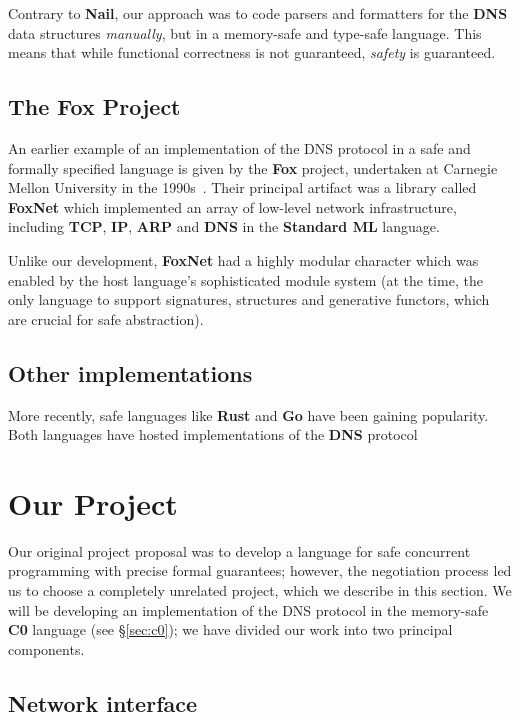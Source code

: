 \documentclass{article}
\newcommand\Kwd[1]{{\sffamily\bfseries{#1}}}
\begin{document}
Contrary to \Kwd{Nail}, our approach was to code parsers and
formatters for the \Kwd{DNS} data structures \emph{manually}, but in a
memory-safe and type-safe language. This means that while functional
correctness is not guaranteed, \emph{safety} is guaranteed.


\subsection*{The \Kwd{Fox} Project}
An earlier example of an implementation of the DNS protocol in a safe
and formally specified language is given by the \Kwd{Fox} project,
undertaken at Carnegie Mellon University in the
1990s~\citep{biagioni-harper-lee-milnes:1994,
  biagioni-harper-lee:2001}. Their principal artifact was a library
called \Kwd{FoxNet} which implemented an array of low-level network
infrastructure, including \Kwd{TCP}, \Kwd{IP}, \Kwd{ARP} and \Kwd{DNS}
in the \Kwd{Standard ML} language.

Unlike our development, \Kwd{FoxNet} had a highly modular character
which was enabled by the host language's sophisticated module system
(at the time, the only language to support signatures, structures and
generative functors, which are crucial for safe abstraction).


\subsection*{Other implementations}

More recently, safe languages
like \Kwd{Rust} and \Kwd{Go} have been gaining popularity. Both
languages have hosted implementations of the \Kwd{DNS}
protocol~\citep{github:trust-dns,github:miekg-dns}


\section{Our Project}\label{sec:our-project}

Our original project proposal was to develop a language for safe
concurrent programming with precise formal guarantees; however, the
negotiation process led us to choose a completely unrelated project,
which we describe in this section. We will be developing an
implementation of the DNS protocol in the memory-safe \Kwd{C0}
language (see \S\ref{sec:c0}); we have divided our work into two
principal components.

\subsection{Network interface}\label{sec:network-interface}
\end{document}
